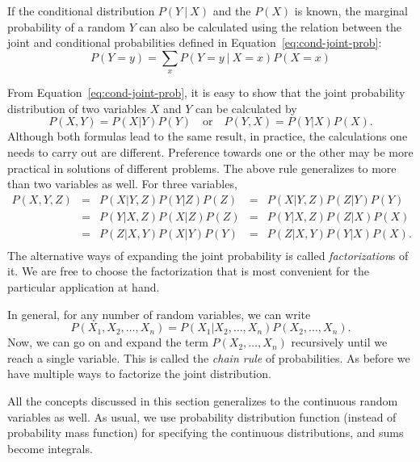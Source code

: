 If the conditional distribution $P(Y\:\vert\:X)$ and the $P(X)$ is known,
the marginal probability of a random $Y$ can also be calculated
using the relation between the joint and conditional probabilities
defined in Equation~\ref{eq:cond-joint-prob}:
\begin{equation*}\label{eq:marginal-prob-cond}
  P(Y = y)  = \sum_{x} P(Y=y\:\vert\:X=x) P(X=x)
\end{equation*}

From Equation~\ref{eq:cond-joint-prob}, it is easy to show that
the joint probability distribution of two variables $X$ and $Y$ can be 
calculated by
\[
  P(X, Y) = P(X|Y) P(Y)\quad\text{or}\quad P(Y, X) = P(Y|X) P(X) .
\]
Although both formulas lead to the same result,
in practice, the calculations one needs to carry out are different.
Preference towards one or the other may be
more practical in solutions of different problems.
The above rule generalizes to more than two variables as well.
For three variables,
\begin{equation}\label{eq:prob-chain-rule-3var}
  \begin{aligned} 
    P(X,Y,Z) &=& P(X|Y,Z) P(Y|Z) P(Z) &=& P(X|Y,Z) P(Z|Y) P(Y)\\
             &=& P(Y|X,Z) P(X|Z) P(Z) &=& P(Y|X,Z) P(Z|X) P(X)\\
             &=& P(Z|X,Y) P(X|Y) P(Y) &=& P(Z|X,Y) P(Y|X) P(X).\\
  \end{aligned}
\end{equation}
The alternative ways of expanding the joint probability is
called \emph{factorization}s of it. 
We are free to choose the factorization
that is most convenient for the particular application at hand.

In general, for any number of random variables, we can write
\begin{equation}\label{eq:prob-chain-rule}
  P(X_{1}, X_{2}, \ldots, X_{n}) = 
    P(X_{1}| X_{2}, \ldots, X_{n}) P(X_{2}, \ldots, X_{n}) .
\end{equation}
Now, we can go on and expand the term $P(X_{2}, \ldots, X_{n})$ recursively
until we reach a single variable.
This is called the \emph{chain rule} of probabilities.
As before we have multiple ways to factorize the joint distribution.%

All the concepts discussed in this section generalizes to
the continuous random variables as well.
As usual, we use probability distribution function
(instead of probability mass function) for specifying the continuous distributions,
and sums become integrals.

